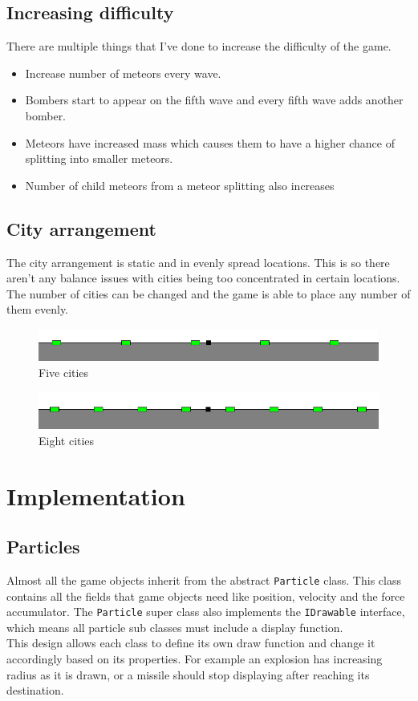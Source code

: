 \documentclass{article}
\newcommand{\n}[0]{\\[\baselineskip]}
\begin{document}
\subsection{Increasing difficulty}
There are multiple things that I've done to increase the difficulty of the game. 
\begin{itemize}
\item Increase number of meteors every wave.
\item Bombers start to appear on the fifth wave and every fifth wave adds another bomber.
\item Meteors have increased mass which causes them to have a higher chance of splitting into smaller meteors.
\item Number of child meteors from a meteor splitting also increases 
\end{itemize}
\subsection{City arrangement}
The city arrangement is static and in evenly spread locations. This is so there aren't any balance issues with cities being too concentrated in certain locations. The number of cities can be changed and the game is able to place any number of them evenly. 
\begin{figure}[H]
\centering
\includegraphics[width=1\textwidth, keepaspectratio]{imgs/FiveCities.png}
\caption{Five cities}
\end{figure}

\begin{figure}[H]
\centering
\includegraphics[width=1\textwidth, keepaspectratio]{imgs/EightCities.png}
\caption{Eight cities}
\end{figure}
\noindent

\section{Implementation}
\subsection{Particles}
Almost all the game objects inherit from the abstract \texttt{Particle} class. This class contains all the fields that game objects need like position, velocity and the force accumulator. The \texttt{Particle} super class also implements the \texttt{IDrawable} interface, which means all particle sub classes must include a display function.
\n
This design allows each class to define its own draw function and change it accordingly based on its properties. For example an explosion has increasing radius as it is drawn, or a missile should stop displaying after reaching its destination. 
\end{document}
